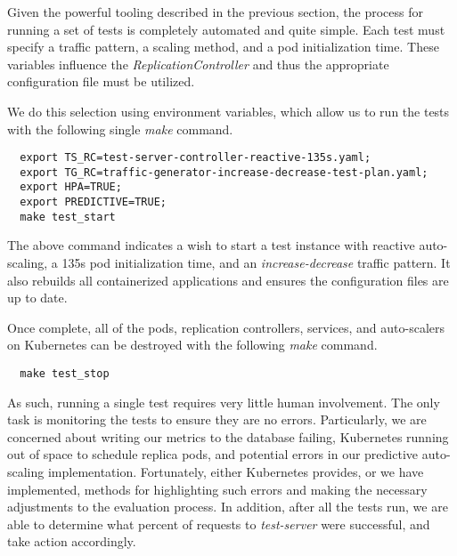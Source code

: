 Given the powerful tooling described in the previous section, the process for
running a set of tests is completely automated and quite simple. Each test
must specify a traffic pattern, a scaling method, and a pod initialization time.
These variables influence the \textit{ReplicationController} and thus the
appropriate configuration file must be utilized.

We do this selection using environment variables, which allow us to run the
tests with the following single \textit{make} command.

\begin{verbatim}
  export TS_RC=test-server-controller-reactive-135s.yaml;
  export TG_RC=traffic-generator-increase-decrease-test-plan.yaml;
  export HPA=TRUE;
  export PREDICTIVE=TRUE;
  make test_start
\end{verbatim}

The above command indicates a wish to start a test instance with reactive
auto-scaling, a 135s pod initialization time, and an
\textit{increase-decrease} traffic pattern. It also rebuilds all containerized
applications and ensures the configuration files are up to date.

Once complete, all of the pods, replication controllers, services, and
auto-scalers on Kubernetes can be destroyed with the following \textit{make}
command.

\begin{verbatim}
  make test_stop
\end{verbatim}

As such, running a single test requires very little human involvement. The only
task is monitoring the tests to ensure they are no errors. Particularly, we are
concerned about writing our metrics to the database failing, Kubernetes
running out of space to schedule replica pods, and potential errors in our
predictive auto-scaling implementation. Fortunately, either Kubernetes provides,
or we have implemented, methods for highlighting such errors and making the
necessary adjustments to the evaluation process. In addition, after all the
tests run, we are able to determine what percent of requests to
\textit{test-server} were successful, and take action accordingly.
